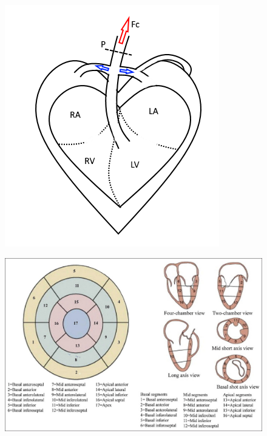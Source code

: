 \begin{figure}
\centering
\begin{minipage}{.5\textwidth}
  \centering
  \includegraphics[width=0.7\linewidth]{./images/simplified_heart.png}
  \label{fig:sim_heart}
\end{minipage}%
\begin{minipage}{.5\textwidth}
  \centering
  \includegraphics[width=0.95\linewidth]{./images/17_segment.jpg}
  \label{fig:segment_heart}
\end{minipage}
\end{figure}

